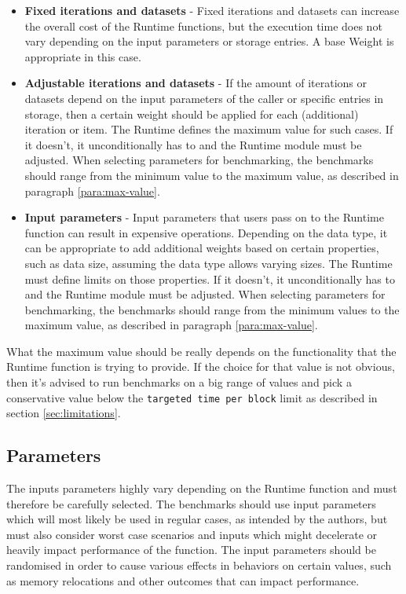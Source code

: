 \documentclass[11pt,a4paper]{article}
\begin{document}
\begin{itemize}
  \item \textbf{Fixed iterations and datasets} - Fixed iterations and datasets
  can increase the overall cost of the Runtime functions, but the execution time
  does not vary depending on the input parameters or storage entries. A base
  Weight is appropriate in this case.
  \item \textbf{Adjustable iterations and datasets} - If the amount of
  iterations or datasets depend on the input parameters of the caller or
  specific entries in storage, then a certain weight should be applied for each
  (additional) iteration or item. The Runtime defines the maximum value for such
  cases. If it doesn't, it unconditionally has to and the Runtime module must be
  adjusted. \newline\newline
  When selecting parameters for benchmarking, the benchmarks should range from
  the minimum value to the maximum value, as described in paragraph
  \ref{para:max-value}.
  \item \textbf{Input parameters} - Input parameters that users pass on to the
  Runtime function can result in expensive operations. Depending on the data
  type, it can be appropriate to add additional weights based on certain
  properties, such as data size, assuming the data type allows varying sizes.
  The Runtime must define limits on those properties. If it doesn't, it
  unconditionally has to and the Runtime module must be adjusted.
  \newline\newline
  When selecting parameters for benchmarking, the benchmarks should range from
  the minimum values to the maximum value, as described in paragraph
  \ref{para:max-value}.
\end{itemize}

\label{para:max-value} What the maximum value should be really depends on the
functionality that the Runtime function is trying to provide. If the choice for
that value is not obvious, then it's advised to run benchmarks on a big range of
values and pick a conservative value below the \verb|targeted time per block|
limit as described in section \ref{sec:limitations}.

\subsection{Parameters}
The inputs parameters highly vary depending on the Runtime function and must
therefore be carefully selected. The benchmarks should use input parameters
which will most likely be used in regular cases, as intended by the authors, but
must also consider worst case scenarios and inputs which might decelerate or
heavily impact performance of the function. The input parameters should be
randomised in order to cause various effects in behaviors on certain values,
such as memory relocations and other outcomes that can impact performance.
\newline
\end{document}
